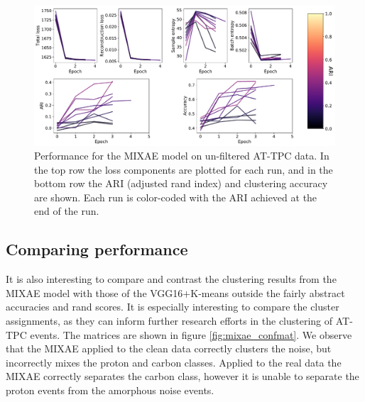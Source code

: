 \begin{figure}[H]
\centering
\includegraphics[width=\textwidth]{./plots/real_mixae.pdf}
\caption{Performance for the MIXAE model on un-filtered AT-TPC data. In the top row the loss components are plotted for each run, and in the bottom row the ARI (adjusted rand index) and clustering accuracy are shown. Each run is color-coded with the ARI achieved at the end of the run.}\label{fig:mixae_full}
\end{figure}

\subsection{Comparing performance}

It is also interesting to compare and contrast the clustering results from the MIXAE model with those of the VGG16$+$K-means outside the fairly abstract accuracies and rand scores. It is especially interesting to compare the cluster assignments, as they can inform further research efforts in the clustering of AT-TPC events. The matrices are shown in figure \ref{fig:mixae_confmat}. We observe that the MIXAE applied to the clean data correctly clusters the noise, but incorrectly mixes the proton and carbon classes. Applied to the real data the MIXAE correctly separates the carbon class, however it is unable to separate the proton events from the amorphous noise events.

